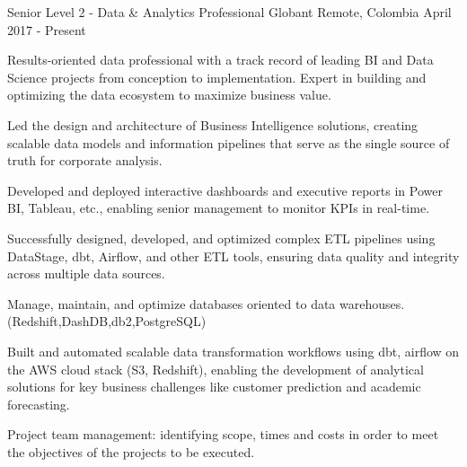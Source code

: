 

\begin{cventries}

  \cventry
    {Senior Level 2 - Data \& Analytics Professional} %
    {Globant} %
    {Remote, Colombia} %
    {April 2017 - Present} %
    {                                                 
      Results-oriented data professional with a track record of leading BI and Data Science projects from conception to implementation. Expert in building and optimizing the data ecosystem to maximize business value.      
      \vspace{1.5em}
      \begin{cvitems}
        \item {Led the design and architecture of Business Intelligence solutions, creating scalable data models and information pipelines that serve as the single source of truth for corporate analysis.}
        \item {Developed and deployed interactive dashboards and executive reports in Power BI, Tableau, etc., enabling senior management to monitor KPIs in real-time.}
        \item {Successfully designed, developed, and optimized complex ETL pipelines using DataStage, dbt, Airflow, and other ETL tools, ensuring data quality and integrity across multiple data sources.}
        \item {Manage, maintain, and optimize databases oriented to data warehouses. (Redshift,DashDB,db2,PostgreSQL)}
        \item {Built and automated scalable data transformation workflows using dbt, airflow on the AWS cloud stack (S3, Redshift), enabling the development of analytical solutions for key business challenges like customer prediction and academic forecasting.}
        \item {Project team management: identifying scope, times and costs in order to meet the objectives of the projects to be executed.}
      \end{cvitems}
    }

\end{cventries}
